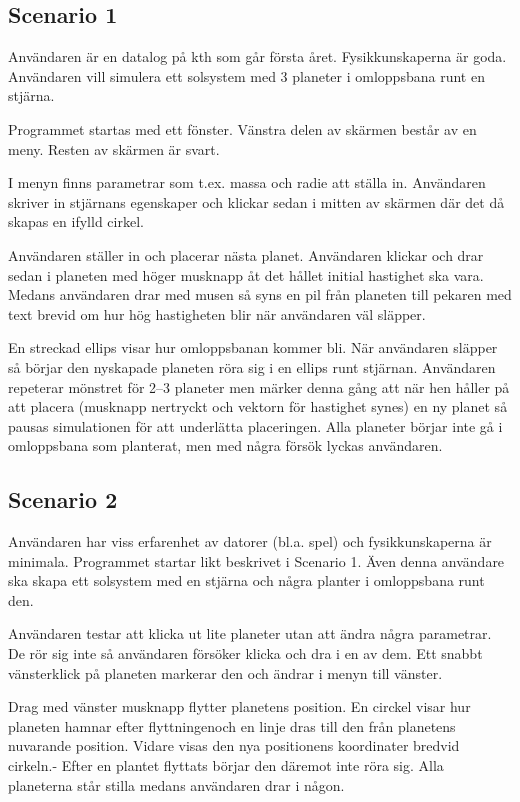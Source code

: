 \subsection{Scenario 1}

Användaren är en datalog på kth som går första året.
Fysikkunskaperna är goda.
Användaren vill simulera ett solsystem med 3 planeter
i omloppsbana runt en stjärna.

Programmet startas med ett fönster.
Vänstra delen av skärmen består av en meny.
Resten av skärmen är svart.

I menyn finns parametrar som t.ex. massa och radie att ställa in.
Användaren skriver in stjärnans egenskaper och klickar
sedan i mitten av skärmen där det då skapas en ifylld cirkel.

Användaren ställer in och placerar nästa planet.
Användaren klickar och drar sedan i planeten med
höger musknapp åt det hållet initial hastighet ska vara.
Medans användaren drar med musen så syns en pil från planeten till
pekaren med text brevid om hur hög hastigheten blir när användaren väl släpper.

En streckad ellips visar hur omloppsbanan kommer bli.
När användaren släpper så börjar den nyskapade planeten röra sig
i en ellips runt stjärnan.
Användaren repeterar mönstret för 2--3 planeter men märker denna gång
att när hen håller på att placera (musknapp nertryckt och vektorn
för hastighet synes) en ny planet så pausas simulationen för att
underlätta placeringen.
Alla planeter börjar inte gå i omloppsbana som planterat,
men med några försök lyckas användaren.

\subsection{Scenario 2}

Användaren har viss erfarenhet av datorer (bl.a. spel) och
fysikkunskaperna är minimala.
Programmet startar likt beskrivet i Scenario 1.
Även denna användare ska skapa ett solsystem med en stjärna
och några planter i omloppsbana runt den.

Användaren testar att klicka ut lite planeter utan att ändra några parametrar.
De rör sig inte så användaren försöker klicka och dra i en av dem.
Ett snabbt vänsterklick på planeten markerar den och ändrar i menyn
till vänster.

Drag med vänster musknapp flytter planetens position.
En circkel visar hur planeten hamnar efter flyttningenoch en linje dras
till den från planetens nuvarande position.
Vidare visas den nya positionens koordinater bredvid cirkeln.-
Efter en plantet flyttats börjar den däremot inte röra sig.
Alla planeterna står stilla medans användaren drar i någon.


